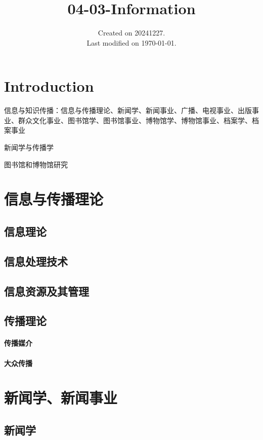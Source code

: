\documentclass[UTF8]{../../ApplicationUniverse}
\begin{document}
\title{04-03-Information}
\date{Created on 20241227.\\   Last modified on \today.}
\maketitle
\tableofcontents


\chapter{Introduction}

信息与知识传播：信息与传播理论、新闻学、新闻事业、广播、电视事业、出版事业、群众文化事业、图书馆学、图书馆事业、博物馆学、博物馆事业、档案学、档案事业


新闻学与传播学

图书馆和博物馆研究


\chapter{信息与传播理论}
\section{信息理论}
\section{信息处理技术}
\section{信息资源及其管理}
\section{传播理论}
    \subsubsection{传播媒介}
    \subsubsection{大众传播}



\chapter{新闻学、新闻事业}
\section{新闻学}
\end{document}
